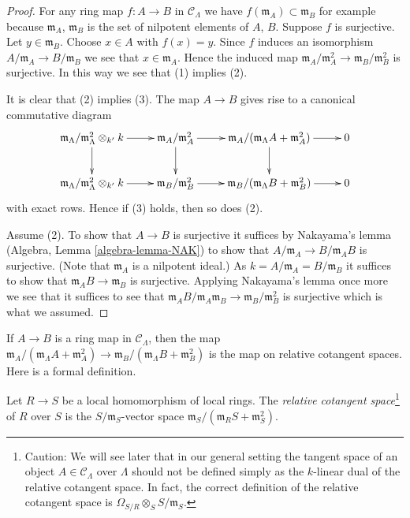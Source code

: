 \begin{proof}
For any ring map $f : A \to B$ in $\mathcal{C}_\Lambda$ we have
$f(\mathfrak m_A) \subset \mathfrak m_B$ for example because
$\mathfrak m_A$, $\mathfrak m_B$ is the set of nilpotent elements of
$A$, $B$. Suppose $f$ is surjective. Let $y \in \mathfrak m_B$.
Choose $x \in A$ with $f(x) = y$. Since $f$ induces an isomorphism
$A/\mathfrak m_A \to B/\mathfrak m_B$ we see that $x \in \mathfrak m_A$.
Hence the induced map
$\mathfrak m_A/\mathfrak m_A^2 \to \mathfrak m_B/\mathfrak m_B^2$
is surjective. In this way we see that (1) implies (2).

\medskip\noindent
It is clear that (2) implies (3). The map $A \to B$ gives rise
to a canonical commutative diagram
$$
\xymatrix{
\mathfrak m_\Lambda/\mathfrak m_\Lambda^2 \otimes_{k'} k \ar[r] \ar[d] &
\mathfrak m_A/\mathfrak m_A^2 \ar[r] \ar[d] &
\mathfrak m_A/(\mathfrak m_\Lambda A + \mathfrak m_A^2) \ar[r] \ar[d] & 0 \\
\mathfrak m_\Lambda/\mathfrak m_\Lambda^2 \otimes_{k'} k \ar[r] &
\mathfrak m_B/\mathfrak m_B^2 \ar[r] &
\mathfrak m_B/(\mathfrak m_\Lambda B + \mathfrak m_B^2) \ar[r] & 0
}
$$
with exact rows. Hence if (3) holds, then so does (2).

\medskip\noindent
Assume (2). To show that $A \to B$ is surjective it suffices by
Nakayama's lemma (Algebra, Lemma \ref{algebra-lemma-NAK})
to show that $A/\mathfrak m_A \to B/\mathfrak m_AB$ is surjective.
(Note that $\mathfrak m_A$ is a nilpotent ideal.)
As $k = A/\mathfrak m_A = B/\mathfrak m_B$ it suffices to show that
$\mathfrak m_AB \to \mathfrak m_B$ is surjective. Applying
Nakayama's lemma once more we see that it suffices to see that
$\mathfrak m_AB/\mathfrak m_A\mathfrak m_B \to \mathfrak m_B/\mathfrak m_B^2$
is surjective which is what we assumed.
\end{proof}

\noindent
If $A \to B$ is a ring map in $\mathcal{C}_\Lambda$, then the map
$\mathfrak m_A/(\mathfrak m_\Lambda A + \mathfrak m_A^2)
\to \mathfrak m_B/(\mathfrak m_\Lambda B + \mathfrak m_B^2)$
is the map on relative cotangent spaces. Here is a formal definition.

\begin{definition}
\label{definition-tangent-space-ring}
Let $R \to S$ be a local homomorphism of local rings. The
{\it relative cotangent space}\footnote{Caution: We will see later
that in our general setting the tangent
space of an object $A \in \mathcal{C}_\Lambda$ over $\Lambda$ should
not be defined simply as the $k$-linear dual of the relative
cotangent space. In fact, the correct definition of the relative
cotangent space is
$\Omega_{S/R} \otimes_S S/\mathfrak m_S$.} of $R$ over $S$ is the
$S/\mathfrak m_S$-vector space
$\mathfrak m_S/(\mathfrak m_R S + \mathfrak m_S^2)$.
\end{definition}

